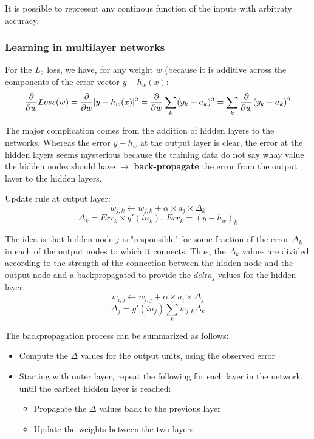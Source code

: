 \documentclass{scrartcl}
\DeclarePairedDelimiter\abs{\lvert}{\rvert}%
\begin{document}
It is possible to represent any continous function of the inputs with arbitraty accuracy.

\subsubsection{Learning in multilayer networks}
For the \(L_2\) loss, we have, for any weight \(w\) (because it is additive across the components of the error vector \(y - h_w(x)\):
\[\frac{\partial}{\partial w} Loss(w) = \frac{\partial}{\partial w} \abs{y-h_w(x)}^2 = \frac{\partial}{\partial w} \sum_k (y_k - a_k)^2 = \sum_k \frac{\partial}{\partial w} (y_k - a_k)^2\]

The major complication comes from the addition of hidden layers to the networks. Whereas the error \(y -h_w\) at the output layer is clear, the error at the hidden layers seems mysterious because the training data do not say whay value the hidden nodes should have \(\rightarrow\) \textbf{back-propagate} the error from the output layer to the hidden layers.

Update rule at output layer:
\[w_{j,k} \leftarrow w_{j,k} + \alpha \times a_j \times \Delta_k\]
\[\Delta_k = Err_k \times g'(in_k), \ Err_k = (y-h_w)_k\]

The idea is that hidden node \(j\) is "responsible" for some fraction of the error \(\Delta_k\) in each of the output nodes to which it connects. Thus, the \(\Delta_k\) values are divided according to the strength of the connection between the hidden node and the output node and a backpropagated to provide the \(delta_j\) values for the hidden layer:
\[w_{i,j} \leftarrow w_{i,j} + \alpha \times a_i \times \Delta_j\]
\[\Delta_j = g'(in_j) \sum_k w_{j,k} \Delta_k\]

The backpropagation process can be summarized as follows:
\begin{itemize}
    \item
        Compute the \(\Delta\) values for the output units, using the observed error
    \item
        Starting with outer layer, repeat the following for each layer in the network, until the earliest hidden layer is reached:
        \begin{itemize}
            \item
                Propagate the \(\Delta\) values back to the previous layer
            \item
                Update the weights between the two layers
        \end{itemize}
\end{itemize}
\end{document}
